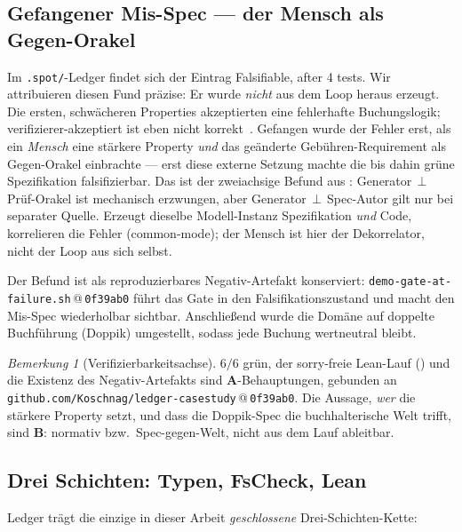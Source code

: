 \documentclass[11pt,a4paper]{article}
\newcommand{\AB}[1]{\textbf{#1}}
\theoremstyle{definition}
\theoremstyle{remark}
\newtheorem{bemerkung}{Bemerkung}[section]
\begin{document}
\subsection{Gefangener Mis-Spec --- der Mensch als Gegen-Orakel}
\label{sec:ledger-misspec}

Im \texttt{.spot/}-Ledger findet sich der Eintrag \glqq Falsifiable, after 4 tests\grqq. Wir
attribuieren diesen Fund präzise: Er wurde \emph{nicht} aus dem Loop heraus erzeugt. Die ersten,
schwächeren Properties akzeptierten eine fehlerhafte Buchungslogik; verifizierer-akzeptiert ist
eben nicht korrekt~\cite{veriact2026}. Gefangen wurde der Fehler erst, als ein \emph{Mensch}
eine stärkere Property \emph{und} das geänderte Gebühren-Requirement als Gegen-Orakel einbrachte
--- erst diese externe Setzung machte die bis dahin grüne Spezifikation falsifizierbar. Das ist
der zweiachsige Befund aus : Generator\,$\perp$\,Prüf-Orakel ist mechanisch
erzwungen, aber Generator\,$\perp$\,Spec-Autor gilt nur bei separater Quelle. Erzeugt dieselbe
Modell-Instanz Spezifikation \emph{und} Code, korrelieren die Fehler (common-mode); der Mensch
ist hier der Dekorrelator, nicht der Loop aus sich selbst.

Der Befund ist als reproduzierbares Negativ-Artefakt konserviert:
\texttt{demo-gate-at-failure.sh}\,@\,\texttt{0f39ab0} führt das Gate in den Falsifikationszustand
und macht den Mis-Spec wiederholbar sichtbar. Anschließend wurde die Domäne auf doppelte
Buchführung (Doppik) umgestellt, sodass jede Buchung wertneutral bleibt.

\begin{bemerkung}[Verifizierbarkeitsachse]
\label{bem:ledger-achse}
\glqq $6/6$ grün\grqq, der sorry-freie Lean-Lauf () und die Existenz
des Negativ-Artefakts sind \AB{A}-Behauptungen, gebunden an
\texttt{github.com/Koschnag/ledger-casestudy}\,@\,\texttt{0f39ab0}. Die Aussage, \emph{wer} die
stärkere Property setzt, und dass die Doppik-Spec die buchhalterische Welt trifft, sind
\AB{B}: normativ bzw.\ Spec-gegen-Welt, nicht aus dem Lauf ableitbar.
\end{bemerkung}

\subsection{Drei Schichten: Typen, FsCheck, Lean}
\label{sec:ledger-schichten}

Ledger trägt die einzige in dieser Arbeit \emph{geschlossene} Drei-Schichten-Kette:
\end{document}
